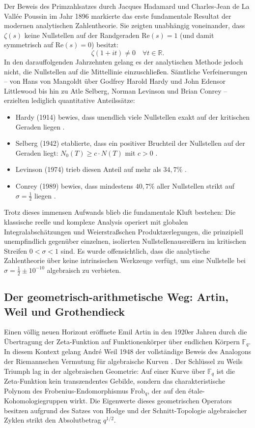 \documentclass[11pt,a4paper]{article}
\theoremstyle{definition}
\theoremstyle{remark}
\numberwithin{equation}{section}
\begin{document}
Der Beweis des Primzahlsatzes durch Jacques Hadamard \cite{Hadamard1896} und Charles-Jean de La Vallée Poussin \cite{LaValleePoussin1896} im Jahr 1896 markierte das erste fundamentale Resultat der modernen analytischen Zahlentheorie. Sie zeigten unabhängig voneinander, dass $\zeta(s)$ keine Nullstellen auf der Randgeraden $\mathrm{Re}(s) = 1$ (und damit symmetrisch auf $\mathrm{Re}(s) = 0$) besitzt:
\begin{equation}
\zeta(1 + it) \neq 0 \quad \forall t \in \mathbb{R}.
\end{equation}
In den darauffolgenden Jahrzehnten gelang es der analytischen Methode jedoch nicht, die Nullstellen auf die Mittellinie einzuschließen. Sämtliche Verfeinerungen – von Hans von Mangoldt über Godfrey Harold Hardy und John Edensor Littlewood bis hin zu Atle Selberg, Norman Levinson und Brian Conrey – erzielten lediglich quantitative Anteilssätze:
\begin{itemize}
    \item Hardy (1914) bewies, dass unendlich viele Nullstellen exakt auf der kritischen Geraden liegen \cite{Hardy1914}.
    \item Selberg (1942) etablierte, dass ein positiver Bruchteil der Nullstellen auf der Geraden liegt: $N_0(T) \ge c \cdot N(T)$ mit $c > 0$ \cite{Selberg1942}.
    \item Levinson (1974) trieb diesen Anteil auf mehr als $34{,}7\%$ \cite{Levinson1974}.
    \item Conrey (1989) bewies, dass mindestens $40{,}7\%$ aller Nullstellen strikt auf $\sigma = \frac{1}{2}$ liegen \cite{Conrey1989}.
\end{itemize}
Trotz dieses immensen Aufwands blieb die fundamentale Kluft bestehen: Die klassische reelle und komplexe Analysis operiert mit globalen Integralabschätzungen und Weierstraßschen Produktzerlegungen, die prinzipiell unempfindlich gegenüber einzelnen, isolierten Nullstellenausreißern im kritischen Streifen $0 < \sigma < 1$ sind. Es wurde offensichtlich, dass die analytische Zahlentheorie über keine intrinsischen Werkzeuge verfügt, um eine Nullstelle bei $\sigma = \frac{1}{2} \pm 10^{-10}$ algebraisch zu verbieten.

\subsection{Der geometrisch-arithmetische Weg: Artin, Weil und Grothendieck}

Einen völlig neuen Horizont eröffnete Emil Artin in den 1920er Jahren durch die Übertragung der Zeta-Funktion auf Funktionenkörper über endlichen Körpern $\mathbb{F}_q$. In diesem Kontext gelang André Weil 1948 der vollständige Beweis des Analogons der Riemannschen Vermutung für algebraische Kurven \cite{Weil1948}. Der Schlüssel zu Weils Triumph lag in der algebraischen Geometrie: Auf einer Kurve über $\mathbb{F}_q$ ist die Zeta-Funktion kein transzendentes Gebilde, sondern das charakteristische Polynom des Frobenius-Endomorphismus $\mathrm{Frob}_q$, der auf den étale-Kohomologiegruppen wirkt. Die Eigenwerte dieses geometrischen Operators besitzen aufgrund des Satzes von Hodge und der Schnitt-Topologie algebraischer Zyklen strikt den Absolutbetrag $q^{1/2}$.
\end{document}
